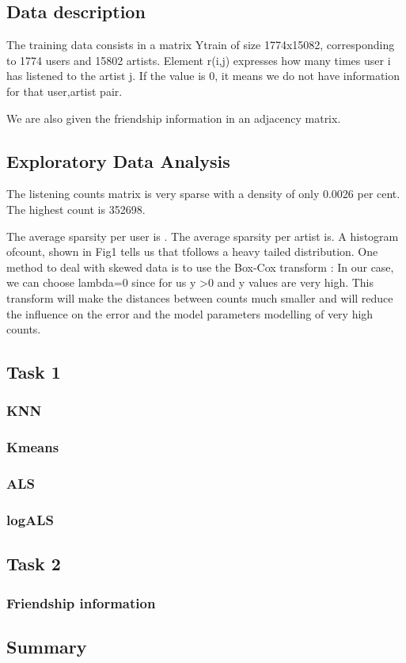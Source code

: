 \subsection{Data description}
The training data consists in a matrix Ytrain of size 1774x15082, corresponding to 1774 users 
and 15802 artists. Element r(i,j) expresses how many times user i has listened to the artist j.
If the value is 0, it means we do not have information for that user,artist pair.

We are also given the friendship information in an adjacency matrix.

\subsection{Exploratory Data Analysis}

The listening counts matrix is very sparse with a density of only 0.0026 per cent.
The highest count is 352698.

The average sparsity per user is . The average sparsity per artist is.
A histogram ofcount, shown in Fig1 tells us that tfollows a heavy tailed distribution.
One method to deal with skewed data is to use the Box-Cox transform :
In our case, we can choose lambda=0 since for us y >0 and y values are very high. 
This transform will make the distances between counts much smaller and will reduce the influence on the error and the model parameters modelling of very high counts.

 
\subsection{Task 1}
\subsubsection{KNN}
\subsubsection{Kmeans}
\subsubsection{ALS}
\subsubsection{logALS}

\subsection{Task 2}
\subsubsection{Friendship information}

\subsection{Summary}


